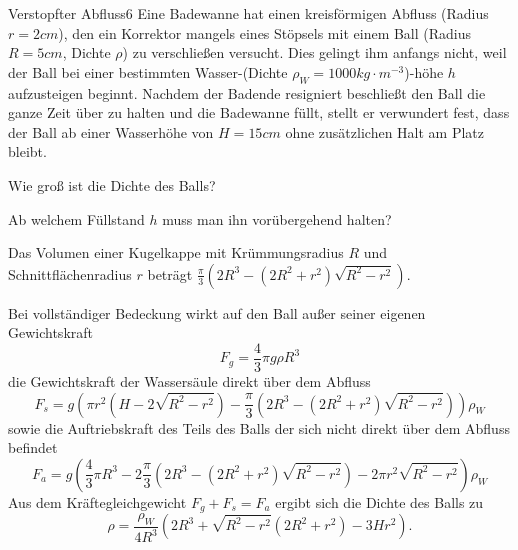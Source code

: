 \begin{problem}{Verstopfter Abfluss}{6}
Eine Badewanne hat einen kreisförmigen Abfluss (Radius $r = 2\unit{cm}$), den ein Korrektor mangels eines Stöpsels mit einem Ball (Radius $R = 5\unit{cm}$, Dichte $\rho$) zu verschließen versucht. Dies gelingt ihm anfangs nicht, weil der Ball bei einer bestimmten Wasser-(Dichte $\rho_W = 1000 \unit{kg \cdot m^{-3}}$)-höhe $h$ aufzusteigen beginnt. Nachdem der Badende resigniert beschließt den Ball die ganze Zeit über zu halten und die Badewanne füllt, stellt er verwundert fest, dass der Ball ab einer Wasserhöhe von $H = 15 \unit{cm}$ ohne zusätzlichen Halt am Platz bleibt.
\begin{abcenum}
\item Wie groß ist die Dichte des Balls?
\item Ab welchem Füllstand $h$ muss man ihn vorübergehend halten?
\end{abcenum}
\hinweis Das Volumen einer Kugelkappe mit Krümmungsradius $R$ und Schnittflächenradius $r$ beträgt $\frac\pi3 \left( 2 R^3 - (2 R^2 + r^2) \sqrt{R^2 - r^2} \right)$.
\begin{solution}
Bei vollständiger Bedeckung wirkt auf den Ball außer seiner eigenen Gewichtskraft
\[
F_g = \frac43 \pi g \rho R^3
\]
die Gewichtskraft der Wassersäule direkt über dem Abfluss
\[
F_s = g \left( \pi r^2  \left( H - 2 \sqrt{ R^2  - r^2 } \right) - \frac\pi3 \left( {2 {R}^{3} } - \left( {2 {R}^{2} } + {r}^{2}  \right) {\sqrt{ {R}^{2}  - {r}^{2}  } } \right) \right) \rho_{W}
\]
sowie die Auftriebskraft des Teils des Balls der sich nicht direkt über dem Abfluss befindet
\[
F_a = {g \left( \frac43 \pi R^3 - 2 \frac\pi3 \left( {2 {R}^{3} } - \left( {2 {R}^{2} } + {r}^{2}  \right) {\sqrt{ {R}^{2}  - {r}^{2}  } } \right) - {{{2 \pi} {r}^{2} } \sqrt{ {R}^{2}  - {r}^{2}  }} \right)} \rho_{W}
\]
Aus dem Kräftegleichgewicht $F_g + F_s = F_a$ ergibt sich die Dichte des Balls zu
\[
\rho  =  \frac{\rho_{W}}{4 R^3 } \left( 2 R^3  + \sqrt{ R^2  - r^2  } \left( {2 {R}^{2} } + {r}^{2}  \right) - 3 H r^2 \right).
\]
\end{solution}
\end{problem}
